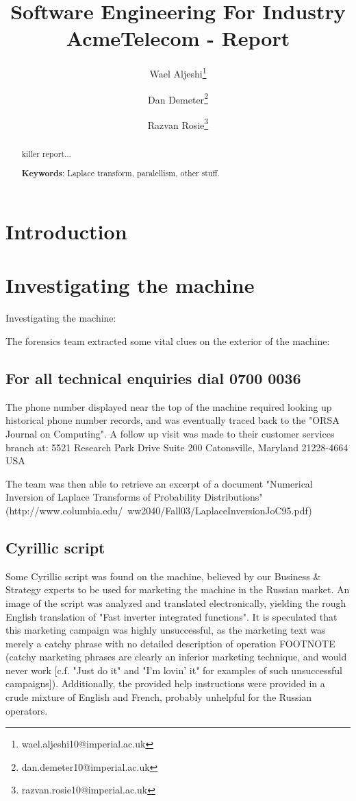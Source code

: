 \documentclass[11pt,twocolumn]{article} %
\title{Software Engineering For Industry \\ AcmeTelecom - Report}
\author[1]{Wael Aljeshi\thanks{wael.aljeshi10@imperial.ac.uk}}
\author[1]{Dan Demeter\thanks{dan.demeter10@imperial.ac.uk}}
\author[1]{Razvan Rosie\thanks{razvan.rosie10@imperial.ac.uk}}
\affil[1]{Department of Computing, Imperial College London}
\begin{document}
\maketitle

\begin{abstract}
killer report...
\newline

{\bf Keywords}: Laplace transform, paralellism, other stuff.
\end{abstract}


\section{Introduction}
\section{Investigating the machine}
Investigating the machine:

The forensics team extracted some vital clues on the exterior of the machine:

\subsection{For all technical enquiries dial 0700 0036}
The phone number displayed near the top of the machine required looking up historical phone number records, and was eventually traced back to the "ORSA Journal on Computing". 
A follow up visit was made to their customer services branch at:
5521 Research Park Drive
Suite 200
Catonsville, Maryland 21228-4664
USA

The team was then able to retrieve an excerpt of a document "Numerical Inversion of Laplace Transforms of Probability Distributions" (http://www.columbia.edu/~ww2040/Fall03/LaplaceInversionJoC95.pdf)



\subsection{Cyrillic script}
Some Cyrillic script was found on the machine, believed by our Business $\&$ Strategy experts to be used for marketing the machine in the Russian market.
An image of the script was analyzed and translated electronically, yielding the rough English translation of "Fast inverter integrated functions".
It is speculated that this marketing campaign was highly unsuccessful, as the marketing text was merely a catchy phrase with no detailed description of operation FOOTNOTE
(catchy marketing phrases are clearly an inferior marketing technique, and would never work [c.f. "Just do it" and "I'm lovin' it" for examples of such unsuccessful campaigns]).
Additionally, the provided help instructions were provided in a crude mixture of English and French, probably unhelpful for the Russian operators.
\end{document}
